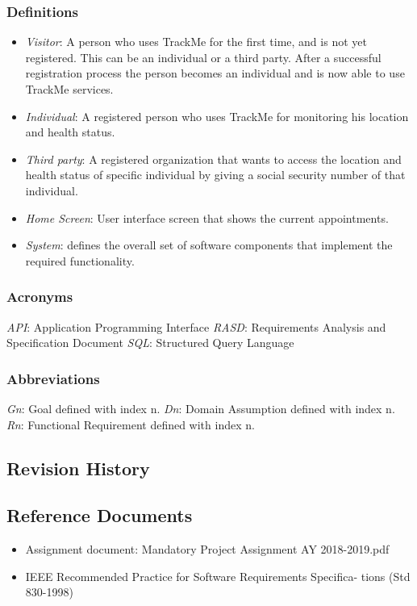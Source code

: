 \documentclass[12pt]{article}
\begin{document}
\subsubsection{Definitions}
\begin{itemize}
\item \textit{Visitor}: A person who uses TrackMe for the first time, and is not yet registered. This can be an individual or a third party. After a successful registration process the person becomes an individual and is now able to use TrackMe services.
\item \textit{Individual}: A registered person who uses TrackMe for monitoring his location and health status.
\item \textit{Third party}: A registered organization that wants to access the location and health status of specific individual by giving a social security number of that individual.
\item \textit{Home Screen}: User interface screen that shows the current appointments.

\item \textit{System}: defines the overall set of software components that implement the required functionality.
\end{itemize}


\subsubsection{Acronyms}
\textit{API}: Application Programming Interface\newline
\textit{RASD}: Requirements Analysis and Specification Document\newline
\textit{SQL}: Structured Query Language\newline
\subsubsection{Abbreviations}
\textit{Gn}: Goal defined with index n.\newline
\textit{Dn}: Domain Assumption defined with index n.\newline
\textit{Rn}: Functional Requirement defined with index n.
\subsection{Revision History}
\subsection{Reference Documents}
\begin{itemize}
\item Assignment document: Mandatory Project Assignment AY 2018-2019.pdf
\item IEEE Recommended Practice for Software Requirements Specifica- tions (Std 830-1998)
\end{itemize}
\end{document}
